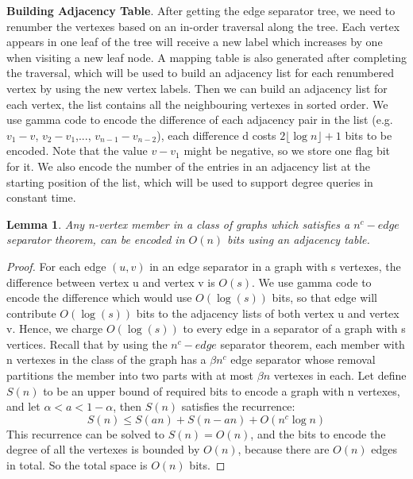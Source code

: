 \documentclass[12pt,glossary]{dalthesis}
\newtheorem{lemma}[theorem]{Lemma}
\begin{document}
\textbf{Building Adjacency Table}. After getting the edge separator tree, we need to renumber the vertexes based on an in-order traversal along the tree. Each vertex appears in one leaf of the tree will receive a new label which increases by one when visiting a new leaf node. A mapping table is also generated after completing the traversal, which will be used to build an adjacency list for each renumbered vertex by using the new vertex labels. Then we can build an adjacency list for each vertex, the list contains all the neighbouring vertexes in sorted order. We use gamma code to encode the difference of each adjacency pair in the list (e.g. $v_{1} - v$, $v_{2} - v_{1}$,..., $v_{n-1} - v_{n-2}$), each difference d costs $2\lfloor \log n \rfloor + 1$ bits to be encoded. Note that the value $v -v_{1}$ might be negative, so we store one flag bit for it. We also encode the number of the entries in an adjacency list at the starting position of the list, which will be used to support degree queries in constant time.

\bigskip
\begin{lemma}
Any n-vertex member in a class of graphs which satisfies a $n^{c}-edge$ separator
theorem, can be encoded in $O(n)$ bits using an adjacency table.
\end{lemma}
\bigskip 

\begin{proof}
For each edge $(u, v)$ in an edge separator in a graph with s vertexes, the difference
between vertex u and vertex v is $O(s)$. We use gamma code to encode the difference which would use $O(\log (s))$ bits, so that edge will contribute $O(\log (s))$ bits to the adjacency lists of both vertex u and vertex v. Hence, we charge $O(\log (s))$ to every edge in a separator of a graph with s vertices. Recall that by using the $n^{c}- edge$ separator theorem, each member with n vertexes in the class of the graph has a $\beta n^{c}$ edge separator whose removal partitions the member into two parts with at most $\beta n$ vertexes in each. Let define $S(n)$ to be an upper bound of required bits to encode a graph with n vertexes, and let $\alpha < a < 1 - \alpha $, then $S(n)$ satisfies the recurrence:
\[ S(n) \leq S(an) + S(n-an) + O(n^{c} \log n) \]
This recurrence can be solved to $S(n) = O(n)$, and the bits to encode the degree of all the vertexes is bounded by $O(n)$, because there are $O(n)$ edges in total. So the total space is $O(n)$ bits.
\end{proof}

\bigskip
\bigskip
\end{document}
